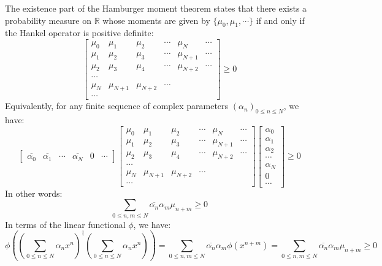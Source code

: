 \documentclass[a4paper,11pt]{article}
\theoremstyle{definition}
\numberwithin{equation}{section}
\begin{document}
The existence part of the Hamburger moment theorem states that there exists a probability measure on $\mathbb{R}$ whose moments are given by $\{\mu_0,\mu_1,\cdots\}$ if and only if the Hankel operator is positive definite:
\begin{equation}
    \begin{bmatrix}
        \mu_0&\mu_1&\mu_2&\cdots&\mu_N&\cdots\\
        \mu_1&\mu_2&\mu_3&\cdots&\mu_{N+1}&\cdots\\
        \mu_2&\mu_3&\mu_4&\cdots&\mu_{N+2}&\cdots\\
        \cdots\\
        \mu_N&\mu_{N+1}&\mu_{N+2}&\cdots\\
        \cdots
    \end{bmatrix}\geq0
\end{equation}
Equivalently, for any finite sequence of complex parameters $(\alpha_n)_{0\leq n\leq N}$, we have:
\begin{equation}
    \begin{bmatrix}
        \overline{\alpha_0}&\overline{\alpha_1}&\cdots&\overline{\alpha_N}&0&\cdots
    \end{bmatrix}\begin{bmatrix}
        \mu_0&\mu_1&\mu_2&\cdots&\mu_N&\cdots\\
        \mu_1&\mu_2&\mu_3&\cdots&\mu_{N+1}&\cdots\\
        \mu_2&\mu_3&\mu_4&\cdots&\mu_{N+2}&\cdots\\
        \cdots\\
        \mu_N&\mu_{N+1}&\mu_{N+2}&\cdots\\
        \cdots
    \end{bmatrix}
    \begin{bmatrix}
        \alpha_0\\\alpha_1\\\alpha_2\\\cdots\\\alpha_N\\0\\\cdots
    \end{bmatrix} \geq 0
\end{equation}
In other words:
\begin{equation}
    \sum_{0\leq n,m\leq N}\overline{\alpha_n}\alpha_m\mu_{n+m} \geq 0
\end{equation}
In terms of the linear functional $\phi$, we have:
\begin{equation}
    \phi((\sum_{0\leq n\leq N}\alpha_nx^n)^\dagger(\sum_{0\leq n\leq N}\alpha_nx^n)) = \sum_{0\leq n,m\leq N}\overline{\alpha_n}\alpha_m\phi(x^{n+m}) = \sum_{0\leq n,m\leq N}\overline{\alpha_n}\alpha_m\mu_{n+m} \geq 0
\end{equation}
\end{document}
